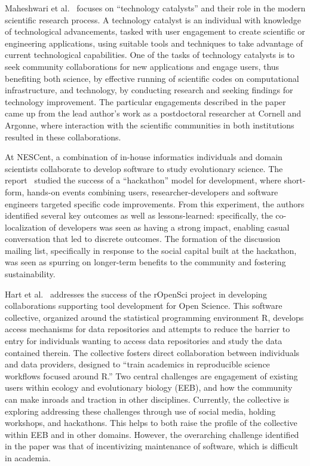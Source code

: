 \documentclass[11pt, oneside]{amsart}
\begin{document}
Maheshwari et al.~\cite{Maheshwari_WSSSPE} focuses on ``technology
catalysts'' and their role in the modern scientific research
process. A technology catalyst is an individual with knowledge of
technological advancements, tasked with user engagement to create
scientific or engineering applications, using suitable tools and
techniques to take advantage of current technological capabilities.
%
One of the tasks of technology catalysts is to seek community
collaborations for new applications and engage users, thus benefiting
both science, by effective running of scientific codes on
computational infrastructure, and technology, by conducting research
and seeking findings for technology improvement.  The particular
engagements described in the paper came up from the lead author's work
as a postdoctoral researcher at Cornell and Argonne, where interaction
with the scientific communities in both institutions resulted in these
collaborations.

At NESCent, a combination of in-house informatics individuals and
domain scientists collaborate to develop software to study
evolutionary science.  The report~\cite{Cranston_WSSSPE} studied the
success of a ``hackathon'' model for development, where short-form,
hands-on events combining users, researcher-developers and software
engineers targeted specific code improvements. From this experiment,
the authors identified several key outcomes as well as
lessons-learned: specifically, the co-localization of developers was
seen as having a strong impact, enabling casual conversation that led
to discrete outcomes.  The formation of the discussion mailing list,
specifically in response to the social capital built at the hackathon,
was seen as spurring on longer-term benefits to the community and
fostering sustainability.

Hart et al.~\cite{Hart_WSSSPE} addresses the success of the rOpenSci
project in developing collaborations supporting tool development for
Open Science.  This software collective, organized around the
statistical programming environment R, develops access mechanisms for
data repositories and attempts to reduce the barrier to entry for
individuals wanting to access data repositories and study the data
contained therein.  The collective fosters direct collaboration
between individuals and data providers, designed to ``train academics
in reproducible science workflows focused around R.''  Two central
challenges are engagement of existing users within ecology and
evolutionary biology (EEB), and how the community can make inroads and
traction in other disciplines. Currently, the collective is exploring
addressing these challenges through use of social media, holding
workshops, and hackathons.  This helps to both raise the profile of
the collective within EEB and in other domains.  However, the
overarching challenge identified in the paper was that of
incentivizing maintenance of software, which is difficult in academia.
\end{document}
